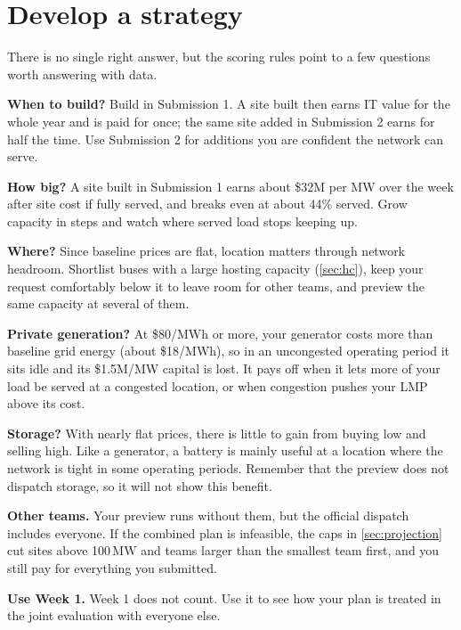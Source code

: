 \documentclass[10pt]{article}
\newcommand{\MW}{\ensuremath{\,\mathrm{MW}}}
\begin{document}
\section{Develop a strategy}\label{sec:strategy}

There is no single right answer, but the scoring rules point to a few
questions worth answering with data.

\textbf{When to build?} Build in Submission 1. A site built then earns IT
value for the whole year and is paid for once; the same site added in
Submission 2 earns for half the time. Use Submission 2 for additions you are
confident the network can serve.

\textbf{How big?} A site built in Submission 1 earns about \$32M per MW over
the week after site cost if fully served, and breaks even at about 44\%
served. Grow capacity in steps and watch where served load stops keeping
up.

\textbf{Where?} Since baseline prices are flat, location matters through
network headroom. Shortlist buses with a large hosting capacity
(\cref{sec:hc}), keep your request comfortably below it to leave room for other
teams, and preview the same capacity at several of them.

\textbf{Private generation?} At \$80/MWh or more, your generator costs more
than baseline grid energy (about \$18/MWh), so in an uncongested operating period it sits
idle and its \$1.5M/MW capital is lost. It pays off when it lets more of your
load be served at a congested location, or when congestion pushes your LMP
above its cost.

\textbf{Storage?} With nearly flat prices, there is little to gain from buying
low and selling high. Like a generator, a battery is mainly useful at a
location where the network is tight in some operating periods. Remember that the preview
does not dispatch storage, so it will not show this benefit.

\textbf{Other teams.} Your preview runs without them, but the official
dispatch includes everyone. If the combined plan is infeasible, the caps in
\cref{sec:projection} cut sites above 100\MW{} and teams larger than the
smallest team first, and you still pay for everything you submitted.

\textbf{Use Week 1.} Week 1 does not count. Use it to see how your plan is
treated in the joint evaluation with everyone else.
\end{document}
